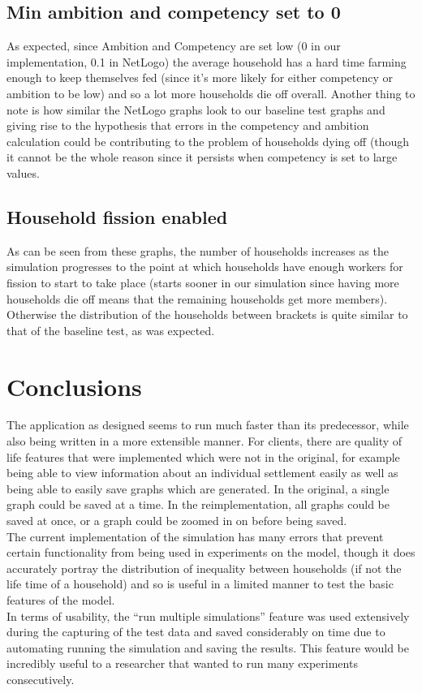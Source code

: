 \documentclass[12pt]{article}
\begin{document}
			\subsection{Min ambition and competency set to 0}
				As expected, since Ambition and Competency are set low (0 in our implementation, 0.1 in NetLogo) the average household has a hard time farming enough to keep themselves fed (since it’s more likely for either competency or ambition to be low) and so a lot more households die off overall. Another thing to note is how similar the NetLogo graphs look to our baseline test graphs and giving rise to the hypothesis that errors in the competency and ambition calculation could be contributing to the problem of households dying off (though it cannot be the whole reason since it persists when competency is set to large values.
			
			\subsection{Household fission enabled}			
				As can be seen from these graphs, the number of households increases as the simulation progresses to the point at which households have enough workers for fission to start to take place (starts sooner in our simulation since having more households die off means that the remaining households get more members). Otherwise the distribution of the households between brackets is quite similar to that of the baseline test, as was expected.
			
			
			
	\section{Conclusions}
		The application as designed seems to run much faster than its predecessor, while also being written in a more extensible manner. For clients, there are quality of life features that were implemented which were not in the original, for example being able to view information about an individual settlement easily as well as being able to easily save graphs which are generated. In the original, a single graph could be saved at a time. In the reimplementation, all graphs could be saved at once, or a graph could be zoomed in on before being saved.\\
		The current implementation of the simulation has many errors that prevent certain functionality from being used in experiments on the model, though it does accurately portray the distribution of inequality between households (if not the life time of a household) and so is useful in a limited manner to test the basic features of the model.\\
		In terms of usability, the “run multiple simulations” feature was used extensively during the capturing of the test data and saved considerably on time due to automating running the simulation and saving the results. This feature would be incredibly useful to a researcher that wanted to run many experiments consecutively.\\
		
\end{document}
